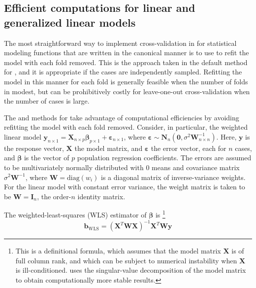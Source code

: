 \documentclass[
]{jss}
\begin{document}
\subsection{Efficient computations for linear and generalized linear
models}\label{efficient-computations-for-linear-and-generalized-linear-models}

The most straightforward way to implement cross-validation in
 for statistical modeling functions that are written in the
canonical manner is to use  to refit the model with each
fold removed. This is the approach taken in the default method for
, and it is appropriate if the cases are independently
sampled. Refitting the model in this manner for each fold is generally
feasible when the number of folds in modest, but can be prohibitively
costly for leave-one-out cross-validation when the number of cases is
large.

The  and  methods for  take advantage
of computational efficiencies by avoiding refitting the model with each
fold removed. Consider, in particular, the weighted linear model
\(\mathbf{y}_{n \times 1} = \mathbf{X}_{n \times p}\boldsymbol{\beta}_{p \times 1} + \boldsymbol{\varepsilon}_{n \times 1}\),
where
\(\boldsymbol{\varepsilon} \sim \mathbf{N}_n \left(\mathbf{0}, \sigma^2 \mathbf{W}^{-1}_{n \times n}\right)\).
Here, \(\mathbf{y}\) is the response vector, \(\mathbf{X}\) the model
matrix, and \(\boldsymbol{\varepsilon}\) the error vector, each for
\(n\) cases, and \(\boldsymbol{\beta}\) is the vector of \(p\)
population regression coefficients. The errors are assumed to be
multivariately normally distributed with 0 means and covariance matrix
\(\sigma^2 \mathbf{W}^{-1}\), where \(\mathbf{W} = \mathrm{diag}(w_i)\)
is a diagonal matrix of inverse-variance weights. For the linear model
with constant error variance, the weight matrix is taken to be
\(\mathbf{W} = \mathbf{I}_n\), the order-\(n\) identity matrix.

The weighted-least-squares (WLS) estimator of \(\boldsymbol{\beta}\) is
\citep[see, e.g.,][Sec. 12.2.2]{Fox:2016} \footnote{This is a
  definitional formula, which assumes that the model matrix
  \(\mathbf{X}\) is of full column rank, and which can be subject to
  numerical instability when \(\mathbf{X}\) is ill-conditioned.
   uses the singular-value decomposition of the model matrix
  to obtain computationally more stable results.} \[
\mathbf{b}_{\mathrm{WLS}} = \left( \mathbf{X}^T \mathbf{W} \mathbf{X} \right)^{-1} 
  \mathbf{X}^T \mathbf{W} \mathbf{y}
\]
\end{document}
